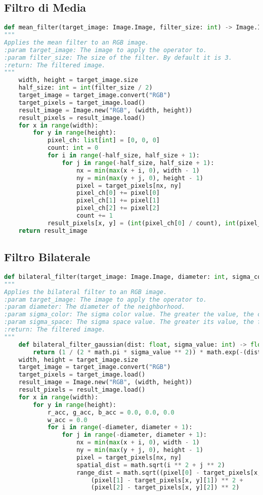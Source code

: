 {\subsection{Filtro di Media}
{\begin{lstlisting}[language=Python, caption={Codice del filtro di media}, label={appendix:mean}]
def mean_filter(target_image: Image.Image, filter_size: int) -> Image.Image:
"""
Applies the mean filter to an RGB image.
:param target_image: The image to apply the operator to.
:param filter_size: The size of the filter. By default it is 3.
:return: The filtered image.
"""	
	width, height = target_image.size
	half_size: int = int(filter_size / 2)
	target_image = target_image.convert("RGB")
	target_pixels = target_image.load()
	result_image = Image.new("RGB", (width, height))
	result_pixels = result_image.load()
	for x in range(width):
		for y in range(height):
			pixel_ch: list[int] = [0, 0, 0]
			count: int = 0
			for i in range(-half_size, half_size + 1):
				for j in range(-half_size, half_size + 1):
					nx = min(max(x + i, 0), width - 1)
					ny = min(max(y + j, 0), height - 1)
					pixel = target_pixels[nx, ny]
					pixel_ch[0] += pixel[0]
					pixel_ch[1] += pixel[1]
					pixel_ch[2] += pixel[2]
					count += 1
			result_pixels[x, y] = (int(pixel_ch[0] / count), int(pixel_ch[1] / count), int(pixel_ch[2] / count))
	return result_image
\end{lstlisting}}
\newpage
\subsection{Filtro Bilaterale}
{\begin{lstlisting}[language=Python, caption={Codice del filtro bilaterale}, label={appendix:bilateral}]
def bilateral_filter(target_image: Image.Image, diameter: int, sigma_color: int, sigma_space: int) -> Image.Image:
"""
Applies the bilateral filter to an RGB image.
:param target_image: The image to apply the operator to.
:param diameter: The diameter of the neighborhood.
:param sigma_color: The sigma color value. The greater the value, the colors farther to each other will start to get mixed
:param sigma_space: The sigma space value. The greater its value, the further pixels will mix together, given that their colors lie within the sigmaColor range.
:return: The filtered image.
"""
	def bilateral_filter_gaussian(dist: float, sigma_value: int) -> float:
		return (1 / (2 * math.pi * sigma_value ** 2)) * math.exp(-(dist ** 2) / (2 * sigma_value ** 2))
	width, height = target_image.size
	target_image = target_image.convert("RGB")
	target_pixels = target_image.load()
	result_image = Image.new("RGB", (width, height))
	result_pixels = result_image.load()
	for x in range(width):
		for y in range(height):
			r_acc, g_acc, b_acc = 0.0, 0.0, 0.0
			w_acc = 0.0
			for i in range(-diameter, diameter + 1):
				for j in range(-diameter, diameter + 1):
					nx = min(max(x + i, 0), width - 1)
					ny = min(max(y + j, 0), height - 1)
					pixel = target_pixels[nx, ny]
					spatial_dist = math.sqrt(i ** 2 + j ** 2)
					range_dist = math.sqrt((pixel[0] - target_pixels[x, y][0]) ** 2 +
						(pixel[1] - target_pixels[x, y][1]) ** 2 +
						(pixel[2] - target_pixels[x, y][2]) ** 2)


\end{lstlisting}}}
